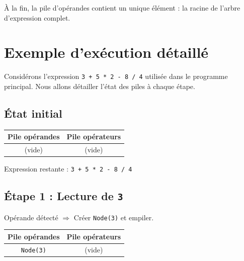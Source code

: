 \documentclass[12pt,a4paper]{article}
\begin{document}
À la fin, la pile d'opérandes contient un unique élément : la racine de l'arbre d'expression complet.

\section{Exemple d'exécution détaillé}

Considérons l'expression \texttt{3 + 5 * 2 - 8 / 4} utilisée dans le programme principal. Nous allons détailler l'état des piles à chaque étape.

\subsection{État initial}

\begin{center}
\begin{tabular}{|c|c|}
\hline
\textbf{Pile opérandes} & \textbf{Pile opérateurs} \\
\hline
(vide) & (vide) \\
\hline
\end{tabular}
\end{center}

Expression restante : \texttt{3 + 5 * 2 - 8 / 4}

\subsection{Étape 1 : Lecture de \texttt{3}}

Opérande détecté $\Rightarrow$ Créer \texttt{Node(3)} et empiler.

\begin{center}
\begin{tabular}{|c|c|}
\hline
\textbf{Pile opérandes} & \textbf{Pile opérateurs} \\
\hline
\texttt{Node(3)} & (vide) \\
\hline
\end{tabular}
\end{center}

\begin{center}
\end{center}
\end{document}
